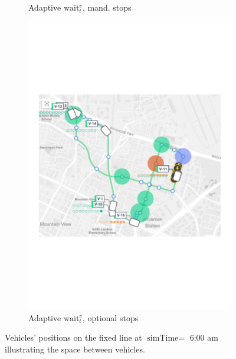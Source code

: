 \documentclass[12pt,a4paper]{article}
\begin{document}
\begin{figure}
\begin{subfigure}[b]{0.4\textwidth}
  \caption{Adaptive $\text{wait}_t^{v}$, mand. stops}
  \label{adaptive}
\end{subfigure}
\begin{subfigure}[b]{0.4\textwidth}
  \includegraphics[width=\linewidth]{./images/optionalstopsgroup.pdf}
  \caption{Adaptive $\text{wait}_t^{v}$, optional stops}
  \label{skip}
\end{subfigure}

\label{simustate}
\caption{Vehicles' positions on the fixed line at $\text{simTime} =$ 6:00 am illustrating the space between vehicles.}
\end{figure}
\end{document}
